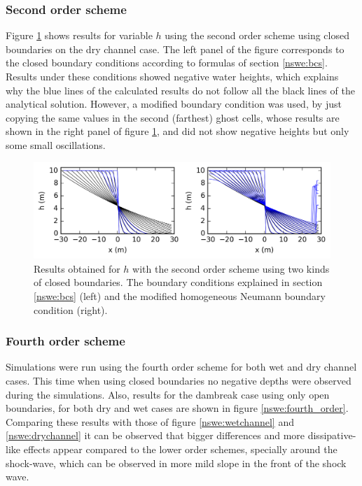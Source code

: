 	\subsubsection{Second order scheme}

	Figure \ref{nswe:second_order} shows results for variable $h$ using the second order scheme using closed boundaries on the dry channel case. The left panel of the figure corresponds to the closed boundary conditions according to formulas of section \ref{nswe:bcs}. Results under these conditions showed negative water heights, which explains why the blue lines of the calculated results do not follow all the black lines of the analytical solution. However, a modified boundary condition was used,
	by just copying the same values in the second (farthest) ghost cells, whose results are shown in the right panel of figure \ref{nswe:second_order}, and did not show negative heights but only some small oscillations.

	\begin{figure}
		\centering
		\includegraphics[width=\textwidth]{figures/db2_hdry.png}
		\caption{Results obtained for $h$ with the second order scheme using two kinds of closed boundaries. The boundary conditions explained in section \ref{nswe:bcs} (left) and the modified homogeneous Neumann boundary condition (right). }
		\label{nswe:second_order}
	\end{figure}

	\subsubsection{Fourth order scheme}

	Simulations were run using the fourth order scheme for both wet and dry channel cases. This time when using closed boundaries no negative depths were observed during the simulations. 	Also, results for the dambreak case using only open boundaries, for both dry and wet cases are shown in figure \ref{nswe:fourth_order}. Comparing these results with those of figure \ref{nswe:wetchannel} and \ref{nswe:drychannel} it can be observed that bigger differences and more dissipative-like effects appear compared to the lower order schemes, specially around the shock-wave, which can be observed in more mild slope in the front of the shock wave. 


